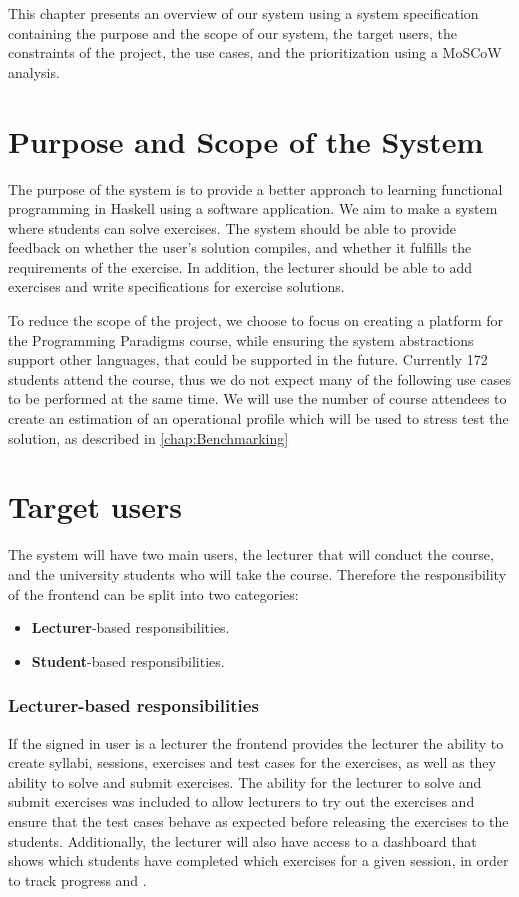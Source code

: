 This chapter presents an overview of our system using a system specification containing the purpose and the scope of our system, the target users, the constraints of the project, the use cases, and the prioritization using a MoSCoW analysis.

\section*{Purpose and Scope of the System}
The purpose of the system is to provide a better approach to learning functional programming in Haskell using a software application.
We aim to make a system where students can solve exercises. The system should be able to provide feedback on whether the user's solution compiles, and whether it fulfills the requirements of the exercise.
In addition, the lecturer should be able to add exercises and write specifications for exercise solutions.

To reduce the scope of the project, we choose to focus on creating a platform for the Programming Paradigms course, while ensuring the system abstractions support other languages, that could be supported in the future.
Currently 172 students attend the course, thus we do not expect many of the following use cases to be performed at the same time.
We will use the number of course attendees to create an estimation of an operational profile which will be used to stress test the solution, as described in \ref{chap:Benchmarking}

\section*{Target users}
The system will have two main users, the lecturer that will conduct the course, and the university students who will take the course.
Therefore the responsibility of the frontend can be split into two categories:
\begin{itemize}
    \item \textbf{Lecturer}-based responsibilities.
    \item \textbf{Student}-based responsibilities.
\end{itemize}

\subsubsection*{Lecturer-based responsibilities}
If the signed in user is a lecturer the frontend provides the lecturer the ability to create syllabi, sessions, exercises and test cases for the exercises, as well as they ability to solve and submit exercises. The ability for the lecturer to solve and submit exercises was included to allow lecturers to try out the exercises and ensure that the test cases behave as expected before releasing the exercises to the students. Additionally, the lecturer will also have access to a dashboard that shows which students have completed which exercises for a given session, in order to track progress and .

